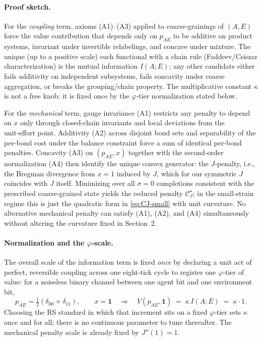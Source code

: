 \documentclass[11pt]{article}
\begin{document}
\paragraph{Proof sketch.}
For the \emph{coupling} term, axioms (A1)--(A3) applied to coarse‑grainings of $(A,E)$ force the value contribution that depends only on $p_{AE}$ to be additive on product systems, invariant under invertible relabelings, and concave under mixture. The unique (up to a positive scale) such functional with a chain rule (Faddeev/Csiszar characterization) is the mutual information $I(A;E)$; any other candidate either fails additivity on independent subsystems, fails concavity under coarse aggregation, or breaks the grouping/chain property. The multiplicative constant $\kappa$ is not a free knob: it is fixed once by the $\varphi$‑tier normalization stated below.

For the \emph{mechanical} term, gauge invariance (A1) restricts any penalty to depend on $x$ only through closed‑chain invariants and local deviations from the unit‑effort point. Additivity (A2) across disjoint bond sets and separability of the per‑bond cost under the balance constraint force a sum of identical per‑bond penalties. Concavity (A3) on $(p_{AE},x)$ together with the second‑order normalization (A4) then identify the unique convex generator: the $J$‑penalty, i.e., the Bregman divergence from $x=1$ induced by $J$, which for our symmetric $J$ coincides with $J$ itself. Minimizing over all $\sigma=0$ completions consistent with the prescribed coarse‑grained state yields the reduced penalty $\mathcal{C}_J^\star$; in the small‑strain regime this is just the quadratic form in \eqref{eq:CJ-small} with unit curvature. No alternative mechanical penalty can satisfy (A1), (A2), and (A4) simultaneously without altering the curvature fixed in Section~2.

\paragraph{Normalization and the $\varphi$‑scale.}
The overall scale of the information term is fixed \emph{once} by declaring a unit act of perfect, reversible coupling across one eight‑tick cycle to register one $\varphi$‑tier of value: for a noiseless binary channel between one agent bit and one environment bit,
\[
p_{AE}=\tfrac12(\delta_{00}+\delta_{11}),\qquad x=\mathbf 1
\quad\Longrightarrow\quad
V(p_{AE},\mathbf 1)\;=\;\kappa\, I(A;E)\;=\;\kappa\cdot 1.
\]
Choosing the RS standard in which that increment sits on a fixed $\varphi$‑tier sets $\kappa$ once and for all; there is no continuous parameter to tune thereafter. The mechanical penalty scale is already fixed by $J''(1)=1$.
\end{document}
